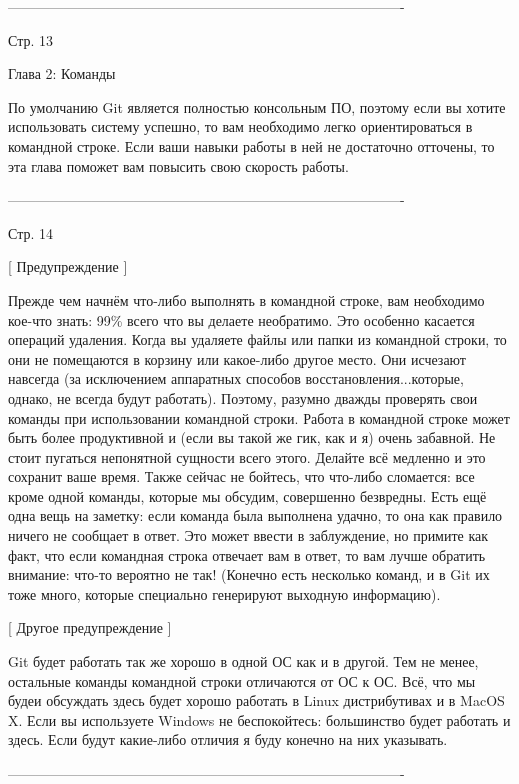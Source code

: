 -------------------------------------------------------------------------------------

Стр. 13

Глава 2: Команды

По умолчанию Git является полностью консольным ПО, поэтому если вы хотите
использовать систему успешно, то вам необходимо легко ориентироваться в командной
строке. Если ваши навыки работы в ней не достаточно отточены, то эта глава поможет 
вам повысить свою скорость работы.

-------------------------------------------------------------------------------------

Стр. 14

[ Предупреждение ]

Прежде чем начнём что-либо выполнять в командной строке, вам необходимо кое-что
знать: 99\% всего что вы делаете необратимо. Это особенно касается операций удаления.
Когда вы удаляете файлы или папки из командной строки, то они не помещаются в корзину
или какое-либо другое место. Они исчезают навсегда (за исключением аппаратных 
способов восстановления...которые, однако, не всегда будут работать). Поэтому, 
разумно дважды проверять свои команды при использовании командной строки.
Работа в командной строке может быть более продуктивной и (если вы такой же гик, как 
и я) очень забавной. Не стоит пугаться непонятной сущности всего этого. Делайте всё
медленно и это сохранит ваше время.
Также сейчас не бойтесь, что что-либо сломается: все кроме одной команды, которые
мы обсудим, совершенно безвредны.
Есть ещё одна вещь на заметку: если команда была выполнена удачно, то она как правило
ничего не сообщает в ответ. Это может ввести в заблуждение, но примите как факт, что
если командная строка отвечает вам в ответ, то вам лучше обратить внимание: что-то
вероятно не так! (Конечно есть несколько команд, и в Git их тоже много, которые
специально генерируют выходную информацию).

[ Другое предупреждение ]

Git будет работать так же хорошо в одной ОС как и в другой. Тем не менее, остальные
команды командной строки отличаются от ОС к ОС. Всё, что мы будеи обсуждать здесь
будет хорошо работать в Linux дистрибутивах и в MacOS X. Если вы используете Windows
не беспокойтесь: большинство будет работать и здесь. Если будут какие-либо отличия я
буду конечно на них указывать.

-------------------------------------------------------------------------------------

